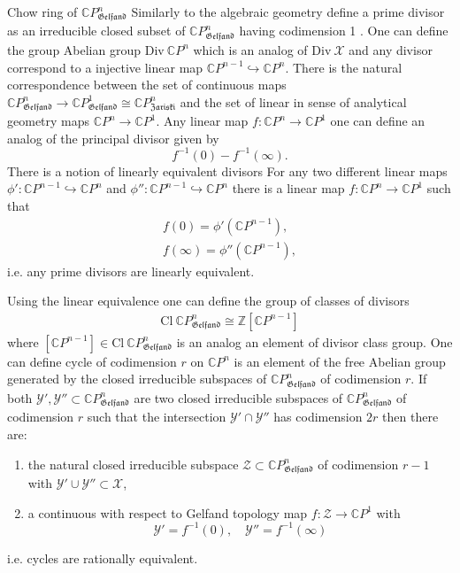 \documentclass{beamer}
\theoremstyle{plain}
\newcommand{\Z}{\mathbb{Z}}
\newcommand{\be}{\begin{equation}}
\newcommand{\ee}{\end{equation}}
\newcommand{\bean}{\begin{eqnarray*}}
\newcommand{\eean}{\end{eqnarray*}}
\newcommand{\C}{\mathbb{C}}
\newcommand{\sX}{\mathcal{X}}       %
\newcommand{\sY}{\mathcal{Y}}       %
\newcommand{\sZ}{\mathcal{Z}}       %
\newcommand{\hookto}{\hookrightarrow}        %
\begin{document}
   \begin{frame}
   	{\Large Chow ring  of $\C P^n_{\mathfrak{Gelfand}}$}
   Similarly to the algebraic geometry define a \alert{prime divisor}  as an irreducible closed subset  of $\C P^n_{\mathfrak{Gelfand}}$ having codimension 1 . One can define the group Abelian group $\mathrm{Div}~\C P^n$ which is an analog of $\mathrm{Div}~\sX$ and any divisor correspond to a injective linear map $\C P^{n - 1} \hookto \C P^n$.
     There is the natural correspondence between the  set of continuous maps  $\C P^n_{\mathfrak{Gelfand}}\to \C P^1_{\mathfrak{Gelfand}}\cong \C P^n_{\mathfrak{Zariski}}$ and the set of linear in sense of analytical geometry  maps $\C P^n\to \C P^1$. Any linear map $f: \C P^n\to \C P^1$ one can define an analog of the \alert{ principal divisor} given by 
   	$$
   	f^{-1}\left( 0\right) - f^{-1}\left(\infty \right). 
   	$$
      There is a notion of \alert{ linearly equivalent} divisors  For any two different linear maps $\phi' :\C P^{n - 1} \hookto \C P^n$ and $\phi'': \C P^{n - 1} \hookto \C P^n$ there is a linear map $f: \C P^n\to \C P^1$ such that 
   \bean
   f\left(0 \right) = \phi'\left(\C P^{n - 1} \right),\\ 
   f\left(\infty \right) = \phi''\left(\C P^{n - 1} \right),
   \eean 
   i.e. any prime divisors are linearly equivalent.
\end{frame}
\begin{frame}
Using the linear equivalence one can define the \alert{group of classes of divisors}
  \bean
   \mathrm {Cl}~\C P^n_{\mathfrak{Gelfand}}\cong \Z\left[\C P^{n-1}\right]
  \eean
   where $\left[\C P^{n-1}\right]\in \mathrm {Cl}~\C P^n_{\mathfrak{Gelfand}}$ is an analog an element of divisor class group. One can define \alert{ cycle of codimension} $r$ on $\C P^n$ is an element 
   of the free Abelian group generated by the closed irreducible subspaces  of $\C P^n_{\mathfrak{Gelfand}}$ of codimension $r$. If both $\sY', \sY'' \subset \C P^n_{\mathfrak{Gelfand}}$ are two    closed irreducible subspaces  of $\C P^n_{\mathfrak{Gelfand}}$ of codimension $r$ such that the intersection $\sY' \cap \sY''$ has codimension $2r$ then there are:
\begin{enumerate}
	\item [(a)] the natural closed irreducible subspace $\sZ \subset \C P^n_{\mathfrak{Gelfand}}$ of codimension  $r - 1$ with $\sY' \cup \sY''\subset \sX$,
	\item [(b)] a continuous with respect to Gelfand topology  map $f: \sZ \to \C P^1$ with
	\be\label{lc_eq_eqn}
	\sY' = f^{-1}\left(0 \right),\quad 
	\sY'' = f^{-1}\left(\infty \right)
	\ee 
	\end{enumerate}
i.e. cycles are \alert{ rationally equivalent}.\end{frame}
\end{document}
